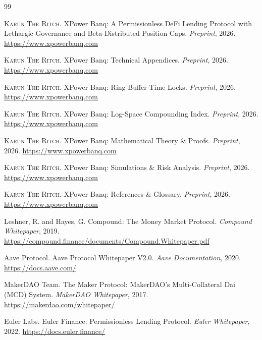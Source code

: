 \begin{thebibliography}{99}


\textsc{Karun The Ritch}.
\newblock XPower Banq: A Permissionless DeFi Lending Protocol with Lethargic Governance and Beta-Distributed Position Caps.
\newblock \emph{Preprint}, 2026.
\newblock \url{https://www.xpowerbanq.com}

\textsc{Karun The Ritch}.
\newblock XPower Banq: Technical Appendices.
\newblock \emph{Preprint}, 2026.
\newblock \url{https://www.xpowerbanq.com}

\textsc{Karun The Ritch}.
\newblock XPower Banq: Ring-Buffer Time Locks.
\newblock \emph{Preprint}, 2026.
\newblock \url{https://www.xpowerbanq.com}

\textsc{Karun The Ritch}.
\newblock XPower Banq: Log-Space Compounding Index.
\newblock \emph{Preprint}, 2026.
\newblock \url{https://www.xpowerbanq.com}

\textsc{Karun The Ritch}.
\newblock XPower Banq: Mathematical Theory \& Proofs.
\newblock \emph{Preprint}, 2026.
\newblock \url{https://www.xpowerbanq.com}

\textsc{Karun The Ritch}.
\newblock XPower Banq: Simulations \& Risk Analysis.
\newblock \emph{Preprint}, 2026.
\newblock \url{https://www.xpowerbanq.com}

\textsc{Karun The Ritch}.
\newblock XPower Banq: References \& Glossary.
\newblock \emph{Preprint}, 2026.
\newblock \url{https://www.xpowerbanq.com}


Leshner, R. and Hayes, G.
\newblock Compound: The Money Market Protocol.
\newblock \emph{Compound Whitepaper}, 2019.
\newblock \url{https://compound.finance/documents/Compound.Whitepaper.pdf}

Aave Protocol.
\newblock Aave Protocol Whitepaper V2.0.
\newblock \emph{Aave Documentation}, 2020.
\newblock \url{https://docs.aave.com/}

MakerDAO Team.
\newblock The Maker Protocol: MakerDAO's Multi-Collateral Dai (MCD) System.
\newblock \emph{MakerDAO Whitepaper}, 2017.
\newblock \url{https://makerdao.com/whitepaper/}

Euler Labs.
\newblock Euler Finance: Permissionless Lending Protocol.
\newblock \emph{Euler Whitepaper}, 2022.
\newblock \url{https://docs.euler.finance/}


\end{thebibliography}
